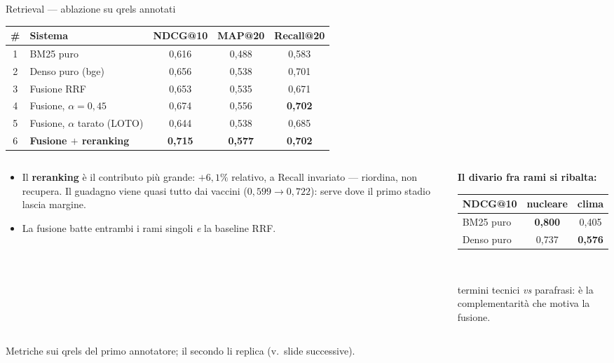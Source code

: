 \documentclass[aspectratio=169,11pt]{beamer}
\begin{document}
\begin{frame}{Retrieval --- ablazione su qrels annotati}
  \centering
  \small
  \begin{tabular}{clccc}
    \toprule
    \textbf{\#} & \textbf{Sistema} & \textbf{NDCG@10} & \textbf{MAP@20} & \textbf{Recall@20} \\
    \midrule
    1 & BM25 puro                  & 0,616 & 0,488 & 0,583 \\
    2 & Denso puro (bge)           & 0,656 & 0,538 & 0,701 \\
    3 & Fusione RRF                & 0,653 & 0,535 & 0,671 \\
    4 & Fusione, $\alpha{=}0{,}45$ & 0,674 & 0,556 & \textbf{0,702} \\
    5 & Fusione, $\alpha$ tarato (LOTO) & 0,644 & 0,538 & 0,685 \\
    6 & \textbf{Fusione $+$ reranking} & \textbf{0,715} & \textbf{0,577} & \textbf{0,702} \\
    \bottomrule
  \end{tabular}

  \vspace{0.6em}
  \begin{columns}[T]
    \begin{column}{0.49\textwidth}
      \footnotesize
      \begin{itemize}\footnotesize
        \item Il \textbf{reranking} è il contributo più grande: $+6{,}1\%$ relativo, a
              Recall invariato --- riordina, non recupera. Il guadagno viene
              \alert{quasi tutto dai vaccini} ($0{,}599 \to 0{,}722$): serve dove il primo
              stadio lascia margine.
        \item La fusione batte entrambi i rami singoli \emph{e} la baseline RRF.
      \end{itemize}
    \end{column}
    \begin{column}{0.49\textwidth}
      \footnotesize
      \textbf{Il divario fra rami si ribalta:}\\[0.2em]
      \centering\scriptsize
      \begin{tabular}{lcc}
        \toprule
        NDCG@10 & nucleare & clima \\
        \midrule
        BM25 puro  & \textbf{0,800} & 0,405 \\
        Denso puro & 0,737 & \textbf{0,576} \\
        \bottomrule
      \end{tabular}\\[0.2em]
      \raggedright termini tecnici \emph{vs} parafrasi: è la complementarità che motiva la fusione.
    \end{column}
  \end{columns}
  \vspace{0.2em}
  {\scriptsize\color{echoslate} Metriche sui qrels del primo annotatore; il secondo li replica
  (v.\ slide successive).}
\end{frame}
\end{document}
